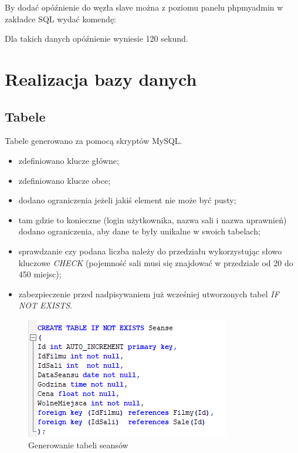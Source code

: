 By dodać opóźnienie do węzła slave można z poziomu panelu phpmyadmin w zakładce SQL wydać komendę:

\lssetdef


Dla takich danych opóźnienie wyniesie 120 sekund.

\section{Realizacja bazy danych}

\subsection{Tabele}

Tabele generowano za pomocą skryptów MySQL.

\begin{itemize}
	\item zdefiniowano klucze główne;
	\item zdefiniowano klucze obce;
	\item dodano ograniczenia jeżeli jakiś element nie może być pusty;
	\item tam gdzie to konieczne (login użytkownika, nazwa sali i nazwa uprawnień) dodano ograniczenia, aby dane te były unikalne w swoich tabelach;
	\item sprawdzanie czy podana liczba należy do przedziału wykorzystując słowo kluczowe \textit{CHECK} (pojemność sali musi się znajdować w przedziale od 20 do 450 miejsc);
	\item zabezpieczenie przed nadpisywaniem już wcześniej utworzonych tabel \textit{IF NOT EXISTS}.
\end{itemize}

\begin{figure} [H]
	\centering
	\includegraphics[width=0.6\linewidth]{rozdzial04/T_Seanse.png}
	\caption{Generowanie tabeli seansów}
	\label{fig:t_seanse}
\end{figure}

